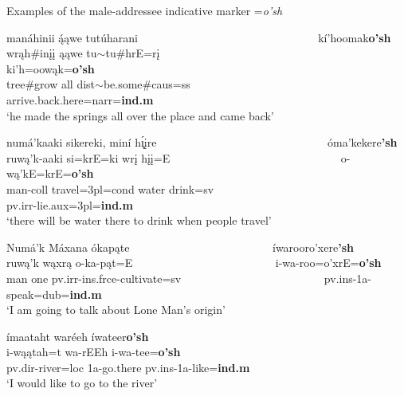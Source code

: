 \begin{exe}

\item\label{oPSexamples} Examples of the male-addressee indicative marker =\textit{o'sh}

	\begin{xlist}
	
	\item\label{oPSexamples1}
	\glll manáhinii ą́ąwe tutúharani ~ ~ ~ ~ ~ ~ ~ ~ ~ ~ ~ ~ ~ ~ ~ ~ ~ ~ ~  kí'hoomak\textbf{o'sh}\\
	wrąh\#inįį ąąwe tu$\sim$tu\#hrE=rį ~ ~ ~ ~ ~ ~ ~ ~ ~ ~ ~ ~ ~ ~ ~ ~ ~ ~ ~ ki'h=oowąk=\textbf{o'sh}\\
	\textnormal{tree}\#\textnormal{grow} \textnormal{all} dist$\sim$\textnormal{be.some}\#caus=ss ~ ~ ~ ~ ~ ~ ~ ~ ~ ~ ~ ~ ~ ~ ~ ~ ~ ~ ~ \textnormal{arrive.back.here}=narr=\textbf{ind.m}\\
	\glt `he made the springs all over the place and came back' \citep[3]{hollow1973a}

	\item\label{oPSexamples2}
	\glll numá'kaaki sikereki, miní h\'{ı̨}įre ~ ~ ~ ~ ~ ~ ~ ~ ~ ~ ~ ~ ~ ~ ~ ~ ~ ~ óma'kekere\textbf{'sh}\\
	ruwą'k-aaki si=krE=ki wrį hįį=E ~ ~ ~ ~ ~ ~ ~ ~ ~ ~ ~ ~ ~ ~ ~ ~ ~ ~ o-wą'kE=krE=\textbf{o'sh}\\
	\textnormal{man}-coll \textnormal{travel}=3pl=cond \textnormal{water} \textnormal{drink}=sv ~ ~ ~ ~ ~ ~ ~ ~ ~ ~ ~ ~ ~ ~ ~ ~ ~ ~ pv.irr-\textnormal{lie}.aux=3pl=\textbf{ind.m}\\
	\glt `there will be water there to drink when people travel' \citep[4]{hollow1973a}

	\item\label{oPSexamples3}
	\glll Numá'k Máxana ókapąte ~ ~ ~ ~ ~ ~ ~ ~ ~ ~ ~ ~ ~ ~ ~  íwarooro'xere\textbf{'sh}\\
	ruwą'k wąxrą o-ka-pąt=E ~ ~ ~ ~ ~ ~ ~ ~ ~ ~ ~ ~ ~ ~ ~  i-wa-roo=o'xrE=\textbf{o'sh}\\
	\textnormal{man} \textnormal{one} pv.irr-ins.frce-\textnormal{cultivate}=sv ~ ~ ~ ~ ~ ~ ~ ~ ~ ~ ~ ~ ~ ~ ~  pv.ins-1a-\textnormal{speak}=dub=\textbf{ind.m}\\
	\glt `I am going to talk about Lone Man's origin' \citep[5]{hollow1973a}

	\item\label{oPSexamples4}
	\glll ímaataht waréeh íwateer\textbf{o'sh}\\
	i-wąątah=t wa-rEEh i-wa-tee=\textbf{o'sh}\\
	pv.dir-\textnormal{river}=loc 1a-\textnormal{go.there} pv.ins-1a-\textnormal{like}=\textbf{ind.m}\\
	\glt `I would like to go to the river' \citep[35]{hollow1973a}
	
	\end{xlist}

\end{exe}

